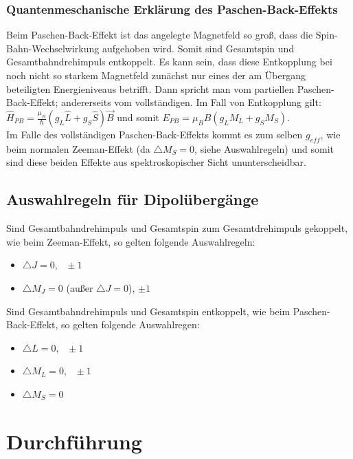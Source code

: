 \subsection{Quantenmeschanische Erklärung des Paschen-Back-Effekts}

Beim Paschen-Back-Effekt ist das angelegte Magnetfeld so groß, dass
die Spin-Bahn-Wechselwirkung aufgehoben wird. Somit sind Gesamtspin
und Gesamtbahndrehimpuls entkoppelt. Es kann sein, dass diese Entkopplung
bei noch nicht so starkem Magnetfeld zunächst nur eines der am Übergang
beteiligten Energieniveaus betrifft. Dann spricht man vom partiellen
Paschen-Back-Effekt; andererseits vom vollständigen. Im Fall von Entkopplung
gilt: $\hat{H}_{PB}=\frac{\mu_{B}}{\hslash}(g_{L}\hat{L}+g_{S}\hat{S})\vec{B}$
und somit $E_{PB}=\mu_{B}B(g_{L}M_{L}+g_{S}M_{S})$.\\
Im Falle des vollständigen Paschen-Back-Effekts kommt es zum selben
$g_{eff}$, wie beim normalen Zeeman-Effekt (da $\triangle M_{S}=0$,
siehe Auswahlregeln) und somit sind diese beiden Effekte aus spektroskopischer
Sicht ununterscheidbar. 


\section{Auswahlregeln für Dipolübergänge}

Sind Gesamtbahndrehimpuls und Gesamtspin zum Gesamtdrehimpuls gekoppelt,
wie beim Zeeman-Effekt, so gelten folgende Auswahlregeln:
\begin{itemize}
\item $\triangle J=0,\mbox{ }\pm1$
\item $\triangle M_{J}=0$ (außer $\triangle J=\text{0}$), $\pm1$
\end{itemize}
Sind Gesamtbahndrehimpuls und Gesamtspin entkoppelt, wie beim Paschen-Back-Effekt,
so gelten folgende Auswahlregen:
\begin{itemize}
\item $\triangle L=0,\mbox{ }\pm1$
\item $\triangle M_{L}=0,\mbox{ }\pm1$
\item $\triangle M_{S}=0$\end{itemize}

\chapter{Durchführung}
